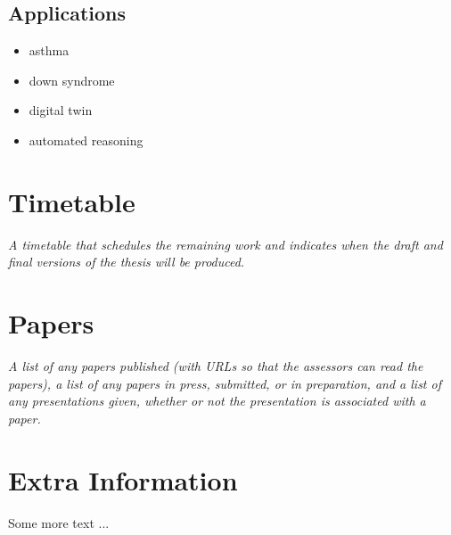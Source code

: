 \documentclass[withindex,glossary,secondyr]{cam-thesis}
\begin{document}
\section{Applications}
\begin{itemize}
    \item asthma
    \item down syndrome
    \item digital twin
    \item automated reasoning
\end{itemize}




\chapter{Timetable}
\textit{A timetable that schedules the remaining work and indicates when the draft and final versions of the thesis will be produced.}

\chapter{Papers}
\textit{A list of any papers published (with URLs so that the assessors can read the papers), a list of any papers in press, submitted, or in preparation, and a list of any presentations given, whether or not the presentation is associated with a paper.}




%

\renewcommand{\bibname}{References}
\cleardoublepage
{}
{}






\appendix

\chapter{Extra Information}
Some more text ...



\printthesisindex
\end{document}
